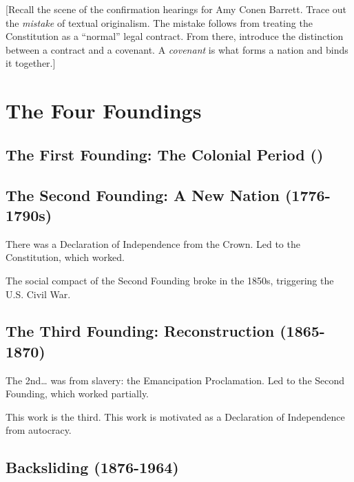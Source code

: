 \documentclass[
]{book}
\begin{document}
{[}Recall the scene of the confirmation hearings for Amy Conen Barrett. Trace out the \emph{mistake} of textual originalism. The mistake follows from treating the Constitution as a ``normal'' legal contract. From there, introduce the distinction between a contract and a covenant. A \emph{covenant} is what forms a nation and binds it together.{]}

\hypertarget{the-four-foundings}{%
\section{The Four Foundings}\label{the-four-foundings}}

\hypertarget{the-first-founding-the-colonial-period}{%
\subsection{The First Founding: The Colonial Period ()}\label{the-first-founding-the-colonial-period}}

\hypertarget{the-second-founding-a-new-nation-1776-1790s}{%
\subsection{The Second Founding: A New Nation (1776-1790s)}\label{the-second-founding-a-new-nation-1776-1790s}}

There was a Declaration of Independence from the Crown. Led to the Constitution, which worked.

The social compact of the Second Founding broke in the 1850s, triggering the U.S. Civil War.

\hypertarget{the-third-founding-reconstruction-1865-1870}{%
\subsection{The Third Founding: Reconstruction (1865-1870)}\label{the-third-founding-reconstruction-1865-1870}}

The 2nd\ldots{} was from slavery: the Emancipation Proclamation. Led to the Second Founding, which worked partially.

This work is the third. This work is motivated as a Declaration of Independence from autocracy.

\hypertarget{backsliding-1876-1964}{%
\subsection{Backsliding (1876-1964)}\label{backsliding-1876-1964}}
\end{document}

